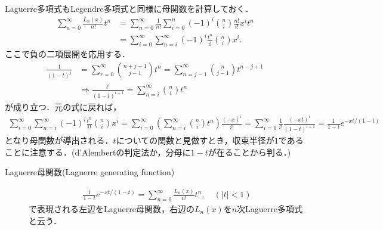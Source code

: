 \documentclass[a4j,papersize,disablejfam,slide,14pt]{jsarticle}
\def\exp#1{e^{#1}} %
\begin{document}
    {\rm Laguerre}多項式も{\rm Legendre}多項式と同様に母関数を計算しておく．
    \begin{align}
    	\sum_{n=0}^{\infty} \frac{L_n(x)}{n!} t^n &= \sum_{n=0}^{\infty} \frac{1}{n!} \sum_{i=0}^{n} (-1)^{i} \binom{n}{i} \frac{n!}{i!} x^i t^n \\
        &= \sum_{i=0}^{\infty} \sum_{n=i}^{\infty} (-1)^{i} \frac{t^n}{i!} \binom{n}{i} x^i.
    \end{align}
    ここで負の二項展開を応用する．
    \begin{align}
    	\frac{1}{(1-t)^j} &= \sum_{r=0}^{\infty} \binom{n+j-1}{j-1} t^n = \sum_{n=j-1}^{\infty} \binom{n}{j-1} t^{n-j+1} \\
    	&\Rightarrow \frac{t^i}{(1-t)^{i+1}} = \sum_{n=i}^{\infty} \binom{n}{i} t^n
    \end{align}
    が成り立つ．元の式に戻れば，
    \begin{align}
    	\sum_{i=0}^{\infty} \sum_{n=i}^{\infty} (-1)^{i} \frac{t^n}{i!} \binom{n}{i} x^i
        = \sum_{i=0}^{\infty} \left( \sum_{n=i}^{\infty} \binom{n}{i} t^n \right) \frac{(-x)^i}{i!}
        = \sum_{i=0}^{\infty} \frac{1}{i!} \frac{(-xt)^i}{(1-t)^{i+1}}
        = \frac{1}{1-t} \exp{-xt/(1-t)}
    \end{align}
    となり母関数が導出される．$t$についての関数と見做すとき，収束半径が$1$であることに注意する．({\rm d'Alembert}の判定法か，分母に$1-t$が在ることから判る．)
    \begin{screen}
    	\begin{description}
        	\item[{\rm Laguerre}母関数({\rm Laguerre generating function})]
            \begin{align}
            	\frac{1}{1-t} \exp{-xt/(1-t)} = \sum_{n=0}^{\infty} \frac{L_n(x)}{n!} t^n, \quad (|t|<1)
            \end{align}
            で表現される左辺を{\rm Laguerre}母関数，右辺の$L_n(x)$を$n$次{\rm Laguerre}多項式と云う．
        \end{description}
    \end{screen}
    
\end{document}
